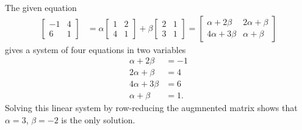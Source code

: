 The given equation
\begin{align*}
\begin{bmatrix} 
-1 & 4 \\ 
6 & 1 
\end{bmatrix} 
&= 
\alpha 
\begin{bmatrix} 
1 & 2 \\ 
4 & 1 
\end{bmatrix} 
+ 
\beta 
\begin{bmatrix} 
2 & 1 \\
 3 & 1 
\end{bmatrix} 
= 
\begin{bmatrix} 
\alpha + 2\beta & 2\alpha + \beta \\
 4\alpha + 3\beta & \alpha + \beta 
\end{bmatrix}
\end{align*}
gives a system of four equations in two variables
\begin{align*}
\alpha + 2\beta &= -1\\
2\alpha + \beta &= 4\\
4\alpha + 3\beta &= 6\\
\alpha + \beta &= 1.
\end{align*}
Solving this linear system by row-reducing the augmnented matrix shows that $\alpha = 3$, $\beta = -2$ is the only solution. 